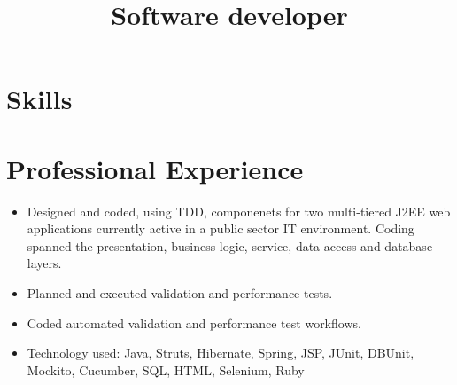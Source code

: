 \documentclass[11pt,letterpaper,sans]{moderncv}   %
\title{Software developer}               %
\begin{document}
\maketitle


\section{Skills}


\section{Professional Experience}
{\begin{itemize}%
\item Designed and coded, using TDD, componenets for two multi-tiered
J2EE web applications currently active in a public sector IT environment.
Coding spanned the presentation, business logic, service, data access and
database layers.
\item Planned and executed validation and performance tests.
\item Coded automated validation and performance test workflows.
\item Technology used: Java, Struts, Hibernate, Spring, JSP, JUnit,
DBUnit, Mockito, Cucumber, SQL, HTML, Selenium, Ruby
\end{itemize}}
\vspace{11pt}
\end{document}
